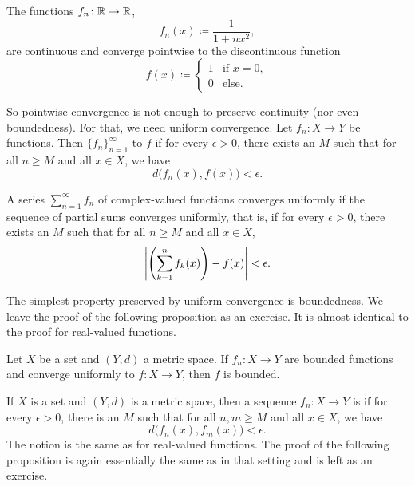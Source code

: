 \begin{example}
The functions $f_n \colon {\mathbb{R}} \to {\mathbb{R}}$,
\begin{equation*}
f_n(x) \coloneqq \frac{1}{1+nx^2},
\end{equation*}
are continuous and converge pointwise to the discontinuous function
\begin{equation*}
f(x) \coloneqq 
\begin{cases}
1 & \text{if } x=0, \\
0 & \text{else.}
\end{cases}
\end{equation*}
\end{example}

So pointwise convergence is not enough to preserve continuity (nor even
boundedness).  For that, we need uniform convergence.
Let $f_n \colon X \to Y$ be functions.  Then
$\{f_n\}_{n=1}^\infty$ \emph{}
to $f$ if
for every $\epsilon > 0$, there exists an $M$ such that
for all $n \geq M$ and all $x \in X$, we have
\begin{equation*}
d\bigl(f_n(x),f(x)\bigr) < \epsilon .
\end{equation*}

A series $\sum_{n=1}^\infty f_n$ of complex-valued functions converges uniformly if the sequence of
partial sums converges uniformly, that is, if for every $\epsilon > 0$,
there exists an $M$ such that
for all $n \geq M$ and all $x \in X$,
\begin{equation*}
\left\lvert {\left(\sum_{k=1}^n f_k(x)\right)-f(x)} \right\rvert < \epsilon .
\end{equation*}

The simplest property preserved by uniform convergence is
boundedness.  We leave the proof of the following proposition as an
exercise.  It is almost identical to the proof for real-valued functions.

\begin{prop} \label{prop:uniformconvbounded}
Let $X$ be a set and $(Y,d)$ a metric space.
If $f_n \colon X \to Y$ are bounded functions and converge uniformly to $f
\colon X \to Y$, then $f$ is bounded.
\end{prop}

If $X$ is a set and $(Y,d)$ is a metric space, then a sequence $f_n \colon X
\to Y$ is \emph{} if for every $\epsilon > 0$, there is an $M$ such that
for all $n, m \geq M$ and all $x \in X$, we have
\begin{equation*}
d\bigl(f_n(x),f_m(x)\bigr) < \epsilon .
\end{equation*}
The notion is the same as for real-valued functions.
The proof of the following proposition is
again essentially the same as in that setting and
is left as an exercise.

